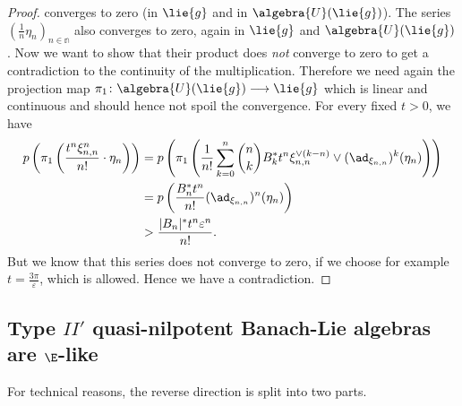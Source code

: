 \documentclass[
11pt,                          %
english                        %
]{article}
\begin{document}
\begin{proof}
	converges to zero (in $\lie{g}$ and in $\algebra{U}(\lie{g})$). The series 
	$(\frac{1}{n} \eta_n)_{n \in \mathbb{n}}$ also converges to zero, again in 
	$\lie{g}$ and $\algebra{U}(\lie{g})$.
	Now we want to show that their product does \emph{not} converge to zero
	to get a contradiction to the continuity of the multiplication. Therefore
	we need again the projection map $\pi_1 \colon \algebra{U}(\lie{g}) 
	\longrightarrow \lie{g}$ which is linear and continuous and should hence not 
	spoil the convergence. For every fixed $t > 0$, we have
	\begin{align*}
		p \left(
			\pi_1\left(
				\frac{t^n \xi_{n,n}^n}{n!}
				\cdot
				\eta_n
			\right)
		\right)
		&=
		p\left(
			\pi_1 \left(
				\frac{1}{n!}
				\sum\limits_{k=0}^n
				\binom{n}{k}
				B_k^* t^n
				\xi_{n,n}^{\vee(k-n)}
				\vee
				(\ad_{\xi_{n,n}})^k(\eta_n)
			\right)
		\right)
		\\
		& =
		p\left(
			\frac{B_n^* t^n}{n!}
			(\ad_{\xi_{n,n}})^n(\eta_n)
		\right)
		\\
		& >
		\frac{|B_n|^* t^n \varepsilon^n}{n!}.
	\end{align*}
	But we know that this series does not converge to zero, if we choose for 
	example $t = \frac{3 \pi}{\varepsilon}$, which is allowed. Hence we have a 
	contradiction.
\end{proof}


\subsection{Type $II'$ quasi-nilpotent Banach-Lie algebras are $\E$-like}

For technical reasons, the reverse direction is split into two parts.
\end{document}
